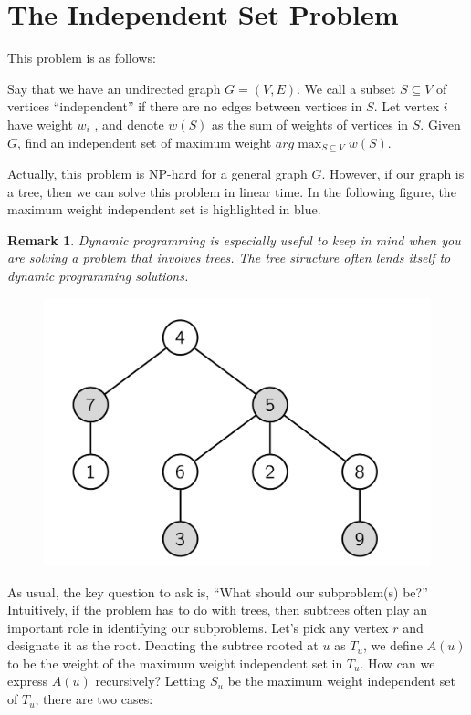 \documentclass [12pt]{article}
\newtheorem{remark}{Remark}
\theoremstyle{definition}
\begin{document}
\section{The Independent Set Problem}

This problem is as follows: 

Say that we have an undirected graph $G = (V, E)$. We call a subset $S \subseteq V$ of vertices ``independent'' if there are no edges between vertices in $S$. Let vertex $i$ have weight $w_i$ , and denote $w(S)$ as the sum of weights of vertices in $S$. Given $G$, find an independent set of maximum weight $arg\max_{S\subseteq V} w(S)$.

Actually, this problem is NP-hard for a general graph $G$. However, if our graph is a tree, then we can solve this problem in linear time. In the following figure, the maximum weight independent set is highlighted in blue.

\begin{remark}
Dynamic programming is especially useful to keep in mind when you are solving a problem that involves trees. The tree structure often lends itself to dynamic programming solutions.
\end{remark}

\begin{figure}[h!]
\centering
\includegraphics[scale=0.5]{max_is.png}
\end{figure}

As usual, the key question to ask is, ``What should our subproblem(s) be?'' Intuitively, if the problem has to do with trees, then subtrees often play an important role in identifying our subproblems. Let's pick any vertex $r$ and designate it as the root. Denoting the subtree rooted at $u$ as $T_u$, we define $A(u)$ to be the weight of the maximum weight independent set in $T_u$. How can we express $A(u)$ recursively? Letting $S_u$ be the maximum weight independent set of $T_u$, there are two cases:
\end{document}
